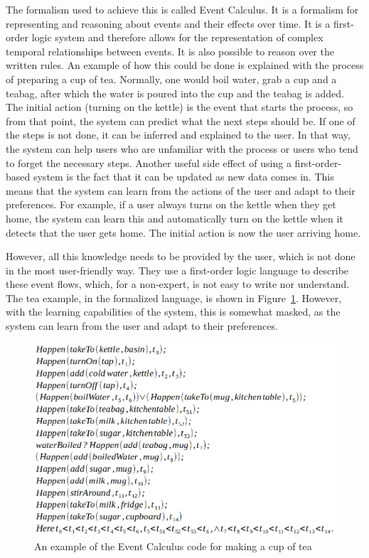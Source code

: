 \documentclass[11pt,a4paper]{report}
\begin{document}
The formalism used to achieve this is called Event Calculus. It is a formalism for representing and reasoning about events and their effects over time. It is a first-order logic system and therefore allows for the representation of complex temporal relationships between events. It is also possible to reason over the written rules. An example of how this could be done is explained with the process of preparing a cup of tea. Normally, one would boil water, grab a cup and a teabag, after which the water is poured into the cup and the teabag is added. The initial action (turning on the kettle) is the event that starts the process, so from that point, the system can predict what the next steps should be. If one of the steps is not done, it can be inferred and explained to the user. In that way, the system can help users who are unfamiliar with the process or users who tend to forget the necessary steps. Another useful side effect of using a first-order-based system is the fact that it can be updated as new data comes in. This means that the system can learn from the actions of the user and adapt to their preferences. For example, if a user always turns on the kettle when they get home, the system can learn this and automatically turn on the kettle when it detects that the user gets home. The initial action is now the user arriving home.

However, all this knowledge needs to be provided by the user, which is not done in the most user-friendly way. They use a first-order logic language to describe these event flows, which, for a non-expert, is not easy to write nor understand. The tea example, in the formalized language, is shown in Figure~\ref{fig:event_code}. However, with the learning capabilities of the system, this is somewhat masked, as the system can learn from the user and adapt to their preferences.

\begin{figure}
    \centering
    \includegraphics[width=0.8\linewidth]{images/event_code.png}
    \caption{An example of the Event Calculus code for making a cup of tea~\cite{SOTA_EventCalculus}}
    \label{fig:event_code}
\end{figure}
\end{document}
